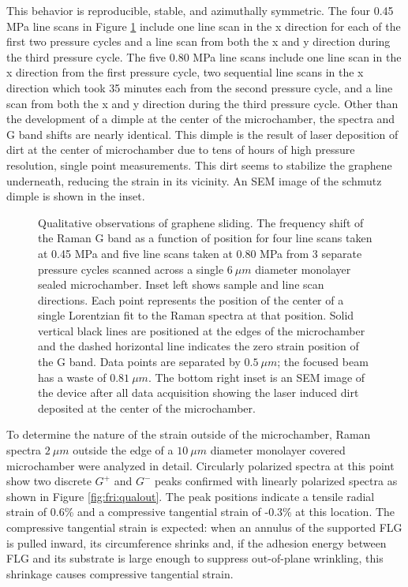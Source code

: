 This behavior is reproducible, stable, and azimuthally symmetric.
The four 0.45 MPa line scans in Figure \ref{fig:fri:qualresults} include one line scan in the x direction for each of the first two pressure cycles and a line scan from both the x and y direction during the third pressure cycle.
The five 0.80 MPa line scans include one line scan in the x direction from the first pressure cycle, two sequential line scans in the x direction which took 35 minutes each from the second pressure cycle, and a line scan from both the x and y direction during the third pressure cycle.
Other than the development of a dimple at the center of the microchamber, the spectra and G band shifts are nearly identical.
This dimple is the result of laser deposition of dirt at the center of microchamber due to tens of hours of high pressure resolution, single point measurements.
This dirt seems to stabilize the graphene underneath, reducing the strain in its vicinity.
An SEM image of the schmutz dimple is shown in the inset.

\begin{figure}
	\begin{center}
	
	\end{center}
	\caption[Qualitative observations of graphene sliding]{\label{fig:fri:qualresults} Qualitative observations of graphene sliding.  The frequency shift of the Raman G band as a function of position for four line scans taken at 0.45 MPa and five line scans taken at 0.80 MPa from 3 separate pressure cycles scanned across a single $6 \ \mu m$ diameter monolayer sealed microchamber. Inset left shows sample and line scan directions.  Each point represents the position of the center of a single Lorentzian fit to the Raman spectra at that position.  Solid vertical black lines are positioned at the edges of the microchamber and the dashed horizontal line indicates the zero strain position of the G band.  Data points are separated by $0.5 \ \mu m$; the focused beam has a waste of $0.81 \ \mu m$.  The bottom right inset is an SEM image of the device after all data acquisition showing the laser induced dirt deposited at the center of the microchamber.}
\end{figure}

To determine the nature of the strain outside of the microchamber, Raman spectra $2 \ \mu m$ outside the edge of a $10 \ \mu m$ diameter monolayer covered microchamber were analyzed in detail.
Circularly polarized spectra at this point show two discrete $G^+$ and $G^-$ peaks confirmed with linearly polarized spectra as shown in Figure \ref{fig:fri:qualout}.
The peak positions indicate a tensile radial strain of 0.6\% and a compressive tangential strain of -0.3\% at this location.
The compressive tangential strain is expected: when an annulus of the supported FLG is pulled inward, its circumference shrinks and, if the adhesion energy between FLG and its substrate is large enough to suppress out-of-plane wrinkling, this shrinkage causes compressive tangential strain.

